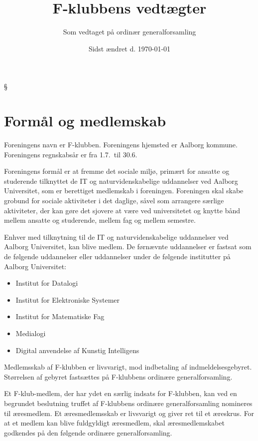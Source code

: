 \documentclass[a4paper,12pt,danish]{article}
\title{\bf F-klubbens vedtægter}
\author{Som vedtaget på ordinær generalforsamling}
\date{Sidst ændret d. \today}
\begin{document}
\maketitle





\begin{list}
{\S {}}{}
\section{Formål og medlemskab}
\item Foreningens navn er F-klubben. Foreningens hjemsted er Aalborg
  kommune. Foreningens regnskabsår er fra 1.7.\ til 30.6.
  
\item Foreningens formål er at fremme det sociale miljø,
  primært for ansatte og studerende tilknyttet de IT og
  naturvidenskabelige uddannelser ved Aalborg Universitet, som er berettiget medlemskab i foreningen. Foreningen
  skal skabe grobund for sociale aktiviteter i det daglige, såvel
  som arrangere særlige aktiviteter, der kan gøre det sjovere at
  være ved universitetet og knytte bånd mellem ansatte og
  studerende, mellem fag og mellem semestre.

\item Enhver med tilknytning til de IT og naturvidenskabelige uddannelser ved Aalborg Universitet, kan blive medlem. De førnævnte uddannelser er fastsat som de følgende uddannelser eller uddannelser under de følgende institutter på Aalborg Universitet:
\begin{itemize}
\item Institut for Datalogi
\item Institut for Elektroniske Systemer
\item Institut for Matematiske Fag
\item Medialogi
\item Digital anvendelse af Kunstig Intelligens
\end{itemize}


\item Medlemsskab af F-klubben er livsvarigt, mod indbetaling af indmeldelsesgebyret.
  Størrelsen af gebyret fastsættes på F-klubbens ordinære generalforsamling.
  
\item Et F-klub-medlem, der har ydet en særlig indsats for
  F-klubben, kan ved en begrundet beslutning truffet af F-klubbens
  ordinære generalforsamling nomineres til æresmedlem. Et
  æresmedlemsskab er livsvarigt og giver ret til et æreskrus. For
  at et medlem kan blive fuldgyldigt æresmedlem, skal æresmedlemskabet
	godkendes på den følgende ordinære
  generalforsamling.
  

\end{list}
\end{document}
